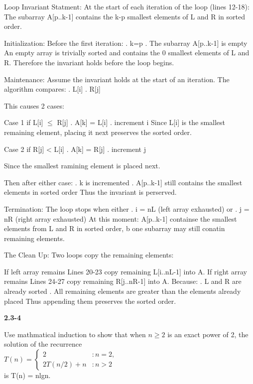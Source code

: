 \begin{description}
\item{Loop Invariant Statment: } 
At the start of each iteration of the loop (lines 12-18):
    The subarray A[p..k-1] contains the k-p smallest elements of L and R in sorted order.

\item{Initialization: } Before the first iteration:
. k=p
. The subarray A[p..k-1] is empty
An empty array is trivially sorted and contains the 0 smallest elements of L and R.
Therefore the invariant holds before the loop begins. 

\item{Maintenance: } Assume the invariant holds at the start of an iteration.
The algorithm compares:
. L[i]
. R[j]

This causes 2 cases:

Case 1
if L[i] $\leq$ R[j]
. A[k] = L[i]
. increment i
Since L[i] is the smallest remaining element, placing it next preserves the sorted order. 

Case 2
if R[j] < L[i]
. A[k] = R[j]
. increment j

Since the smallest ramining element is placed next. 

Then after either case:
. k is incremented
. A[p..k-1] still contains the smallest elements in sorted order
Thus the invariant is perserved.

\item{Termination: } The loop stops when either
. i = nL (left array exhausted) or
. j = nR (right array exhausted)
At this moment:
A[p..k-1] containse the smallest elements from L and R in sorted order, b one subarray may still conatin remaining elements.

\item{The Clean Up: } Two loops copy the remaining elements:

If left array remains
Lines 20-23 copy remaining L[i..nL-1] into A.
If right array remains
Lines 24-27 copy remaining R[j..nR-1] into A.
Because:
. L and R are already sorted
. All remaining elements are greater than the elements already placed
Thus appending them preserves the sorted order.

\end{description}


\textbf{2.3-4}

Use mathmatical induction to show that when $n \geq 2$ is an exact power of 2, the
solution of the recurrence \\
$T(n)=\begin{cases}
2 & :n=2, \\
2T(n/2)+n & :n > 2
\end{cases}$ \\
is T(n) = nlgn. \\

